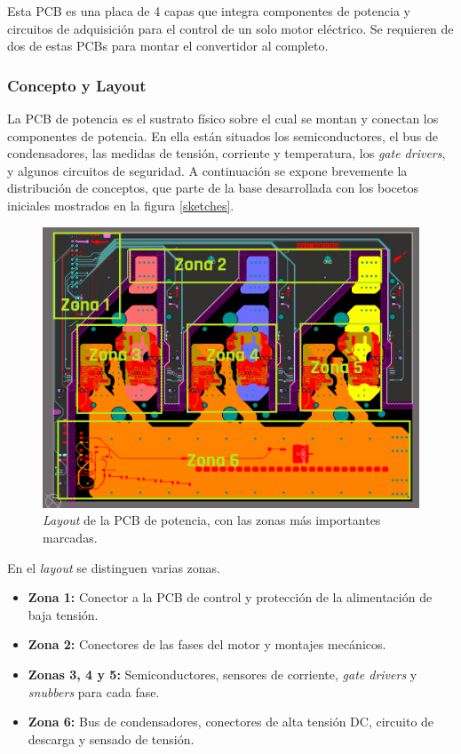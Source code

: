Esta PCB es una placa de 4 capas que integra componentes de potencia y circuitos de adquisición para el control de un solo motor eléctrico. Se requieren de dos de estas PCBs para montar el convertidor al completo.

\subsubsection{Concepto y Layout}

La PCB de potencia es el sustrato físico sobre el cual se montan y conectan los componentes de potencia. En ella están situados los semiconductores, el bus de condensadores, las medidas de tensión, corriente y temperatura, los \textit{gate drivers}, y algunos circuitos de seguridad. A continuación se expone brevemente la distribución de conceptos, que parte de la base desarrollada con los bocetos iniciales mostrados en la figura \ref{sketches}.

\begin{figure}[H]
	\centering
	\includegraphics[width=0.7\linewidth]{fig/layout}
	\caption{\textit{Layout} de la PCB de potencia, con las zonas más importantes marcadas.}
\end{figure}

En el \textit{layout} se distinguen varias zonas. 
\begin{itemize}
	\item \textbf{Zona 1:} Conector a la PCB de control y protección de la alimentación de baja tensión.
	\item \textbf{Zona 2:} Conectores de las fases del motor y montajes mecánicos.
	\item \textbf{Zonas 3, 4 y 5:} Semiconductores, sensores de corriente, \textit{gate drivers} y \textit{snubbers} para cada fase.
	\item \textbf{Zona 6:} Bus de condensadores, conectores de alta tensión DC, circuito de descarga y sensado de tensión.
\end{itemize}

